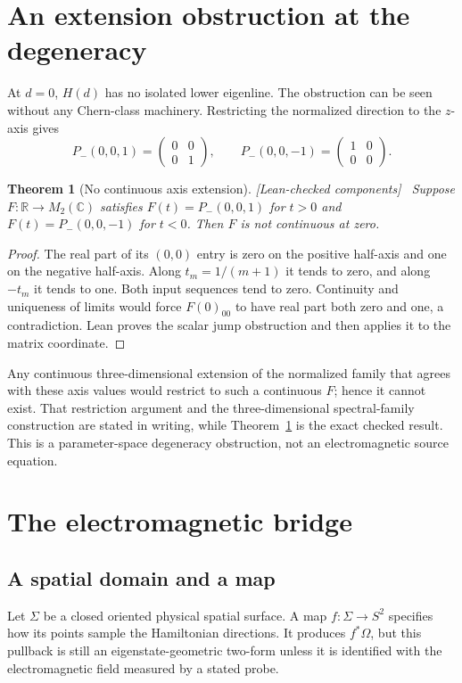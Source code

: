 \documentclass[11pt]{article}
\newtheorem{theorem}{Theorem}[section]
\theoremstyle{definition}\newtheorem{definition}[theorem]{Definition}
\theoremstyle{remark}\newtheorem{remark}[theorem]{Remark}
\newcommand{\R}{\mathbb{R}}
\newcommand{\C}{\mathbb{C}}
\newcommand{\checked}{\textnormal{\small[Lean-checked components]}\ }
\begin{document}
\section{An extension obstruction at the degeneracy}
At $d=0$, $H(d)$ has no isolated lower eigenline. The obstruction can be seen without any Chern-class machinery. Restricting the normalized direction to the $z$-axis gives
\begin{equation}\label{eq:axis}
 P_-(0,0,1)=\begin{pmatrix}0&0\\0&1\end{pmatrix},\qquad
 P_-(0,0,-1)=\begin{pmatrix}1&0\\0&0\end{pmatrix}.
\end{equation}
\begin{theorem}[No continuous axis extension]\label{thm:axis}\checked
Suppose $F:\R\to M_2(\C)$ satisfies $F(t)=P_-(0,0,1)$ for $t>0$ and $F(t)=P_-(0,0,-1)$ for $t<0$. Then $F$ is not continuous at zero.
\end{theorem}
\begin{proof}
The real part of its $(0,0)$ entry is zero on the positive half-axis and one on the negative half-axis. Along $t_m=1/(m+1)$ it tends to zero, and along $-t_m$ it tends to one. Both input sequences tend to zero. Continuity and uniqueness of limits would force $F(0)_{00}$ to have real part both zero and one, a contradiction. Lean proves the scalar jump obstruction and then applies it to the matrix coordinate.
\end{proof}
Any continuous three-dimensional extension of the normalized family that agrees with these axis values would restrict to such a continuous $F$; hence it cannot exist. That restriction argument and the three-dimensional spectral-family construction are stated in writing, while Theorem~\ref{thm:axis} is the exact checked result. This is a parameter-space degeneracy obstruction, not an electromagnetic source equation.

\section{The electromagnetic bridge}
\subsection{A spatial domain and a map}
Let $\Sigma$ be a closed oriented physical spatial surface. A map $f:\Sigma\to S^2$ specifies how its points sample the Hamiltonian directions. It produces $f^*\Omega$, but this pullback is still an eigenstate-geometric two-form unless it is identified with the electromagnetic field measured by a stated probe.
\end{document}
